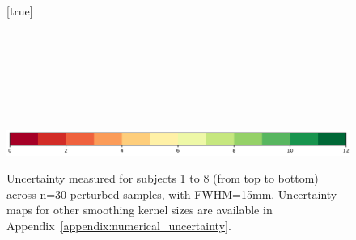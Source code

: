 \documentclass[lettersize,journal]{IEEEtran}
\begin{document}

\begin{figure}
    \centering
    [true] \\
     \\
     \\
     \\
     \\
     \\
     \\
     \\
    \includegraphics*[width=.6\linewidth]{figures/colorbar_sigbit_discrete.pdf}
    \caption{Uncertainty measured for subjects 1 to 8 (from top to bottom) across n=30 perturbed samples, with FWHM=15mm. Uncertainty maps for other smoothing kernel sizes are available in Appendix~\ref{appendix:numerical_uncertainty}.}
    \label{fig:uncertainty-maps}
\end{figure}
\end{document}
